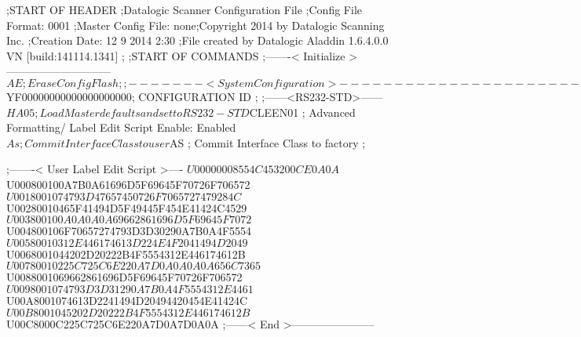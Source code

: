 ;START OF HEADER
;Datalogic Scanner Configuration File
;Config File Format: 0001
;Master Config File: none;Copyright 2014 by Datalogic Scanning Inc.
;Creation Date: 12 9 2014 2:30
;File created by Datalogic Aladdin 1.6.4.0.0 VN [build:141114.1341]
;
;START OF COMMANDS
;-------< Initialize >-----------------------------
$AE                 ; Erase Config Flash
;
;-------< System Configuration >-------------------------------
$YF00000000000000000000; CONFIGURATION ID
;
;------<RS232-STD>------
$HA05               ; Load Master defaults and set to RS232-STD
$CLEEN01            ; Advanced Formatting/ Label Edit Script Enable: Enabled
$As                 ; Commit Interface Class to user
$AS                 ; Commit Interface Class to factory
;

;-------< User Label Edit Script >----
$U00000008554C453200CE0A0A
$U000800100A7B0A61696D5F69645F70726F706572
$U0018001074793D47657450726F7065727479284C
$U00280010465F41494D5F49445F454E41424C4529
$U003800100A0A0A0A69662861696D5F69645F7072
$U004800106F70657274793D3D30290A7B0A4F5554
$U00580010312E446174613D224E4F2041494D2049
$U0068001044202D20222B4F5554312E446174612B
$U00780010225C725C6E220A7D0A0A0A0A656C7365
$U0088001069662861696D5F69645F70726F706572
$U0098001074793D3D31290A7B0A4F5554312E4461
$U00A8001074613D2241494D20494420454E41424C
$U00B8001045202D20222B4F5554312E446174612B
$U00C8000C225C725C6E220A7D0A7D0A0A
;------< End >-----------------------
